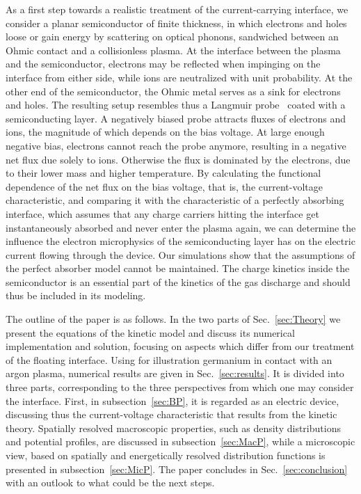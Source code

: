 \documentclass[pre,reprint,floats]{revtex4-1}
\begin{document}
As a first step towards a realistic treatment of the current-carrying interface, we consider a 
planar semiconductor of finite thickness, in which electrons and holes loose or gain energy by 
scattering on optical phonons, sandwiched between an Ohmic contact and a collisionless plasma.
At the interface between the plasma and the semiconductor, electrons may be reflected when impinging 
on the interface from either side, while ions are neutralized with unit probability. At the other 
end of the semiconductor, the Ohmic metal serves as a sink for electrons and holes. The resulting setup
resembles thus a Langmuir probe~\cite{ML26,Cherrington82,Lam65} coated with a semiconducting layer. A 
negatively biased probe attracts fluxes of electrons and ions, the magnitude of which depends on the
bias voltage. At large enough negative bias, electrons cannot reach the probe anymore, resulting in 
a negative net flux due solely to ions. Otherwise the flux is dominated by the electrons, due to 
their lower mass and higher temperature. By calculating the functional dependence of the net flux 
on the bias voltage, that is, the current-voltage characteristic, and comparing it with the 
characteristic of a perfectly absorbing interface, which assumes that any charge carriers hitting 
the interface get instantaneously absorbed and never enter the plasma again, we can determine 
the influence the electron microphysics of the semiconducting layer has on the electric current flowing 
through the device. Our simulations show that the assumptions of the perfect absorber model cannot 
be maintained. The charge kinetics inside the semiconductor is an essential part of the kinetics of 
the gas discharge and should thus be included in its modeling.

The outline of the paper is as follows. In the two parts of Sec.~\ref{sec:Theory} we present the 
equations of the kinetic model and discuss its numerical implementation and solution, focusing on 
aspects which differ from our treatment of the floating interface. Using for illustration 
germanium in contact with an argon plasma, numerical results 
are given in Sec.~\ref{sec:results}. It is divided into three parts, corresponding to the three 
perspectives from which one may consider the interface. First, in subsection~\ref{sec:BP}, it is regarded as 
an electric device, discussing thus the current-voltage characteristic that results from the kinetic 
theory. Spatially resolved macroscopic properties, such as density distributions and potential profiles, 
are discussed in subsection~\ref{sec:MacP}, while a microscopic view, based on spatially and energetically 
resolved distribution functions is presented in subsection~\ref{sec:MicP}. The paper concludes in 
Sec.~\ref{sec:conclusion} with an outlook to what could be the next steps.
	
\end{document}

